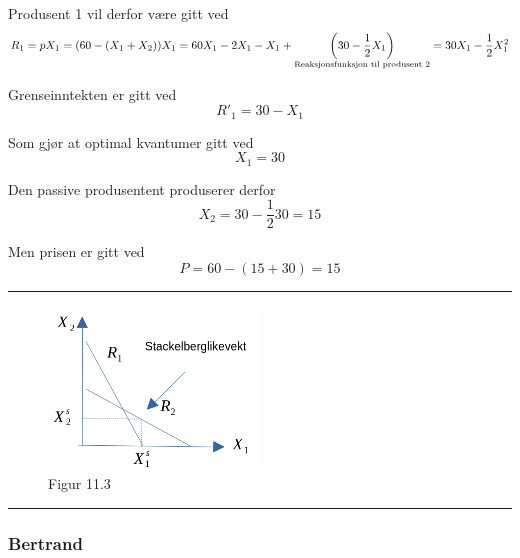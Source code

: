 \documentclass[
  letterpaper,
  DIV=11,
  numbers=noendperiod]{scrartcl}
\begin{document}
Produsent 1 vil derfor være gitt ved \begin{equation*}
R_{1} = pX_{1}=(60-(X_{1}+X_{2}))X_{1} =  \\ 60X_{1}-2X_{1}-X_{1}+ \underset{\text{Reaksjonsfunksjon til produsent 2}}{\left ( 30 - \frac{1}{2}  X_{1}  \right)}
 =
30X_{1}-\frac{1}{2}X_{1}^{2}
\end{equation*}

Grenseinntekten er gitt ved \begin{equation*}
R'_{1} = 30 - X_{1}
\end{equation*}

Som gjør at optimal kvantumer gitt ved \begin{equation*}
X_{1} = 30  
\end{equation*}

Den passive produsentent produserer derfor \begin{equation*}
X_{2} = 30 - \frac{1}{2}{30}= 15  
\end{equation*}

Men prisen er gitt ved \begin{equation*}
P=60-(15+30)= 15
\end{equation*}

\begin{center}\rule{0.5\linewidth}{0.5pt}\end{center}

\begin{figure}[H]

{\centering \includegraphics[width=0.5\textwidth,height=\textheight]{drawio/stackbergl.png}

}

\caption{Figur 11.3}

\end{figure}%

\begin{center}\rule{0.5\linewidth}{0.5pt}\end{center}

\subsubsection{Bertrand}\label{bertrand}
\end{document}
